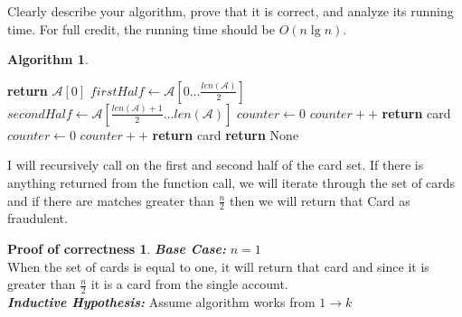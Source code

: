 \documentclass[11pt]{article}
\theoremstyle{definition}
\newtheorem*{algorithm}{Algorithm}
\newtheorem*{proofoc}{Proof of correctness}
\begin{document}
\begin{enumerate}
Clearly describe your algorithm, prove that it is correct, and analyze its running time. 
For full credit, the running time should be $O(n \lg n)$. 
\begin{algorithm}
    \item 
    \begin{algorithmic}[1]
         
            \State \textbf{return} $\mathcal{A}[0]$
        \EndIf
        \State $firstHalf \gets \mathcal{A}[0\dots \frac{len(\mathcal{A})}{2}]$
        \State $secondHalf \gets \mathcal{A}[\frac{len(\mathcal{A})+1}{2}\dots len(\mathcal{A})]$
            \State $counter \gets 0$
                    \State $counter ++$
                \EndIf
            \EndFor
                \State \textbf{return} card
            \EndIf
        \EndIf
            \State $counter \gets 0$
                    \State $counter ++$
                \EndIf
            \EndFor
                \State \textbf{return} card
            \EndIf
        \EndIf
        \State \textbf{return} None
        \EndProcedure
    \end{algorithmic}
    I will recursively call on the first and second half of the card set. If there is anything returned from the function call, we will iterate 
    through the set of cards and if there are matches greater than $\frac{n}{2}$ then we will return that Card as fraudulent.
\end{algorithm}
\newpage
\begin{proofoc}
    \item 
    \textbf{\textit{Base Case: }}$n=1$ \\ 
    When the set of cards is equal to one, it will return that card and since it is greater than $\frac{n}{2}$ it is a card from the single account.\\[0.7em]
    \textbf{\textit{Inductive Hypothesis:}} Assume algorithm works from $1 \rightarrow k$\\[0.7em]

\end{proofoc}
\end{enumerate}
\end{document}
